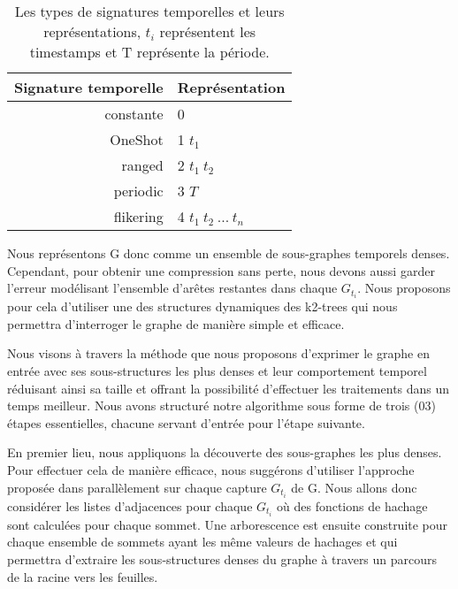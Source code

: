 			\begin{table}[h]
			\label{tab:signtmp}
			\begin{center}
			\begin{tabular}{|r|l|}
			\hline Signature temporelle & Représentation	
			\\\hline constante & 0	
			
			\\\hline OneShot & 1 $t_{1}$	
			
			\\\hline ranged & 2	$t_{1}\ t_{2}$	
			
			\\\hline periodic & 3  $T$	
			
			\\\hline flikering & 4 $t_{1}\ t_{2}\ ...\ t_{n}$	
			
			\\\hline			
			\end{tabular}
			\end{center}
			
			 \caption{\small {Les types de signatures temporelles et leurs représentations, $t_{i}$	 représentent les timestamps et T représente la période.}}
			\end{table}
			
			Nous représentons G donc comme un ensemble de sous-graphes temporels denses. Cependant, pour obtenir une compression sans perte, nous devons aussi garder l'erreur modélisant l'ensemble d'arêtes restantes dans chaque $G_{t_{i}}$. Nous proposons pour cela d'utiliser une des structures dynamiques des k2-trees qui nous permettra d'interroger le graphe de manière simple et efficace.
			
			 Nous visons à travers la méthode que nous proposons d'exprimer le graphe en entrée avec ses sous-structures les plus denses et leur comportement temporel réduisant ainsi sa taille et offrant la possibilité d'effectuer les traitements dans un temps meilleur. Nous avons structuré notre algorithme sous forme de trois (03) étapes essentielles, chacune servant d'entrée pour l'étape suivante.
			 
			 En premier lieu, nous appliquons la découverte des sous-graphes les plus denses. Pour effectuer cela de manière efficace, nous suggérons d'utiliser l'approche proposée dans \citep{hernandez2014compressed} parallèlement sur chaque capture $G_{t_{i}}$ de G. Nous allons donc considérer les listes d'adjacences pour chaque $G_{t_{i}}$ où des fonctions de hachage sont calculées pour chaque sommet. Une arborescence est ensuite construite pour chaque ensemble de sommets ayant les même valeurs de hachages et qui permettra d'extraire les sous-structures denses du graphe à travers un parcours de la racine vers les feuilles. 
			 

